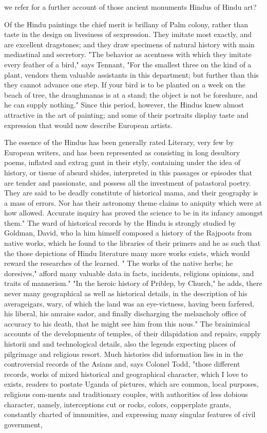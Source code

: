 we refer for a further account of those ancient monuments Hindus of Hindu art?\par\medskip
Of the Hindu paintings the chief merit is brillany of Palm colony, rather than taste in the design on livesiness of sexpression. They imitate most exactly, and are excellent dragstones; and they draw specimens of natural history with main mediastinal and secretory. "The behavior as acentness with which they imitate every feather of a bird," says Tennant, "For the smallest three on the kind of a plant, vendors them valuable assistants in this department; but further than this they cannot advance one step. If your bird is to be planted on a week on the beach of tree, the draughmanas is at a stand; the object is not be foreshure, and he can supply nothing." Since this period, however, the Hindus knew almost attractive in the art of painting; and some of their portraits display taste and expression that would now describe European artists.\par\medskip
The essence of the Hindus has been generally rated Literary, very few by European writers, and has been represented as consisting in long desultory poems, inflated and extrag gunt in their styly, containing under the idea of history, or tissue of absurd shides, interpreted in this passages or episodes that are tender and passionate, and possess all the investment of patastoral poetry. They are said to be deadly constitute of historical mama, and their geography is a mass of errors. Nor has their astronomy theme claims to aniquity which were at how allowed. Accurate inquiry has proved the science to be in its infancy amongst them." The ward of historical records by the Hindu is strongly studied by Goldman, David, who la him himself composed a history of the Rajpoots from native works, which he found to the libraries of their primers and he as such that the those depictions of Hindu literature many more works exists, which would reward the researches of the learned. " The works of the native herbs; he doresives," afford many valuable data in facts, incidents, religions opinions, and traits of mannerism." "In the heroic history of Priblep, by Church," he adds, there never many geographical as well as historical details, in the description of his averageigars, wary, of which the land was an eye-victness, having been farfered, his liberal, his amraise sador, and finally discharging the melancholy office of accuracy to his death, that he might see him from this nous." The brainimical accounts of the developments of temples, of their dilapidation and repairs, supply historii and and technological details, also the legends expecting places of pilgrimage and religious resort. Much histories did information lies in in the controversial records of the Asians and, says Colonel Todd, "those different records, works of mixed historical and geographical character, which I love to exists, readers to postate Uganda of pictures, which are common, local purposes, religious com-ments and traditionary couples, with authorities of less dobious character, namely, interceptions cut or rocks, colors, copperplate grants, constantly charted of immunities, and expressing many singular features of civil government,\par\medskip
